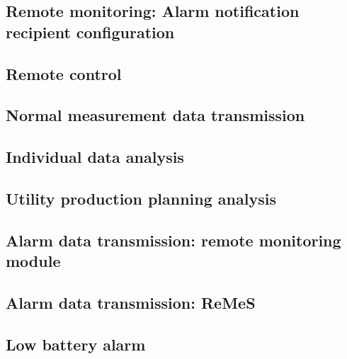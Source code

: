 \subsection{Remote monitoring: Alarm notification recipient configuration}
\label{uc-remote-monitoring-notification-config}


\subsection{Remote control}
\label{uc-remote-control}


\subsection{Normal measurement data transmission}
\label{uc-remote-monitoring-installation}


\subsection{Individual data analysis}
\label{uc-individual-analysis}


\subsection{Utility production planning analysis}
\label{uc-production-planning}


\subsection{Alarm data transmission: remote monitoring module}
\label{uc-alarm-transmission-module}


\subsection{Alarm data transmission: ReMeS}
\label{uc-alarm-transmission-remes}


\subsection{Low battery alarm}
\label{uc-low-battery-alarm}


